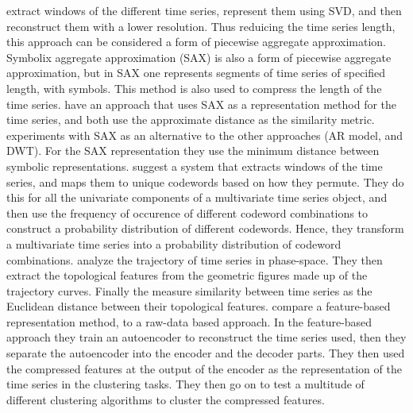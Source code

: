 \textcite{svd_birch_tsc_stock_price} extract windows of the different time series, represent them using SVD, and then reconstruct them with a lower resolution.
Thus reduicing the time series length, this approach can be considered a form of piecewise aggregate approximation. 
Symbolix aggregate approximation (SAX) is also a form of piecewise aggregate approximation, but in SAX one represents segments of time series of specified length, with symbols.
This method is also used to compress the length of the time series. 
\textcite{clust_large_datasets_aghabozorg, apxdist_sax_k_modes} have an approach that uses SAX as a representation method for the time series, and both use the approximate distance as the similarity metric.
\textcite{shape_feat_mod_tsc_rfa} experiments with SAX as an alternative to the other approaches (AR model, and DWT). For the SAX representation they use the minimum distance between symbolic representations.
\textcite{dependency_tsc_energy_markets} suggest a system that extracts windows of the time series, and maps them to unique codewords based on how they permute.
They do this for all the univariate components of a multivariate time series object, 
and then use the frequency of occurence of different codeword combinations to construct a probability distribution of different codewords. 
Hence, they transform a multivariate time series into a probability distribution of codeword combinations. 
\textcite{topology_for_shape_based_tsc} analyze the trajectory of time series in phase-space. 
They then extract the topological features from the geometric figures made up of the trajectory curves. 
Finally the measure similarity between time series as the Euclidean distance between their topological features.
\textcite{auto_encoder_many_tsc_algorithms} compare a feature-based representation method, to a raw-data based approach. 
In the feature-based approach they train an autoencoder to reconstruct the time series used, then they separate the autoencoder into the encoder and the decoder parts. 
They then used the compressed features at the output of the encoder as the representation of the time series in the clustering tasks. 
They then go on to test a multitude of different clustering algorithms to cluster the compressed features. \bigskip

